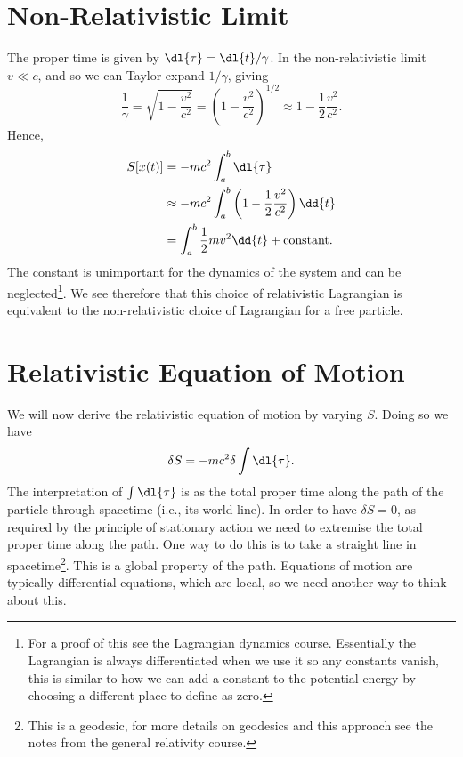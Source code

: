 \section{Non-Relativistic Limit}
The proper time is given by \(\dl{\tau} = \dl{t}/\gamma\).
In the non-relativistic limit \(v \ll c\), and so we can Taylor expand \(1/\gamma\), giving
\begin{equation}
    \frac{1}{\gamma} = \sqrt{1 - \frac{v^2}{c^2}} = \left( 1 - \frac{v^2}{c^2} \right)^{1/2} \approx 1 - \frac{1}{2}\frac{v^2}{c^2}.
\end{equation}
Hence,
\begin{align}
    S[x(t)] &= -mc^2\int_a^b \dl{\tau}\\
    &\approx -mc^2 \int_a^b \left( 1 - \frac{1}{2}\frac{v^2}{c^2} \right) \dd{t}\\
    &=\int_a^b \frac{1}{2}mv^2 \dd{t} + \text{constant}.
\end{align}
The constant is unimportant for the dynamics of the system and can be neglected\footnote{For a proof of this see the Lagrangian dynamics course. Essentially the Lagrangian is always differentiated when we use it so any constants vanish, this is similar to how we can add a constant to the potential energy by choosing a different place to define as zero.}.
We see therefore that this choice of relativistic Lagrangian is equivalent to the non-relativistic choice of Lagrangian for a free particle.

\section{Relativistic Equation of Motion}
We will now derive the relativistic equation of motion by varying \(S\).
Doing so we have
\begin{equation}
    \delta S = -mc^2 \delta\int \dl{\tau}.
\end{equation}
The interpretation of \(\int \dl{\tau}\) is as the total proper time along the path of the particle through spacetime (i.e., its world line).
In order to have \(\delta S = 0\), as required by the principle of stationary action we need to extremise the total proper time along the path.
One way to do this is to take a straight line in spacetime\footnote{This is a geodesic, for more details on geodesics and this approach see the notes from the general relativity course.}.
This is a global property of the path.
Equations of motion are typically differential equations, which are local, so we need another way to think about this.

